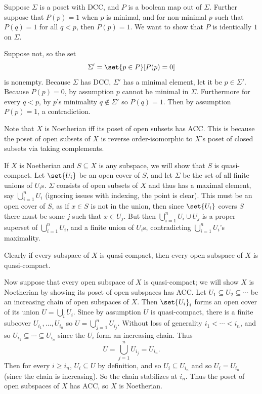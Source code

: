 \eprob

\benum
    \item Suppose $\Sigma$ is a poset with DCC, and $P$ is a boolean map out of $\Sigma$.
    Further suppose that $P(p)=1$ when $p$ is minimal, and for non-minimal $p$ such that $P(q)=1$ for all $q<p$, then
    $P(p)=1$.
    We want to show that $P$ is identically $1$ on $\Sigma$.

    Suppose not, so the set
    $$ \Sigma' = \set{p\in P}[P(p)=0] $$
    is nonempty.
    Because $\Sigma$ has DCC, $\Sigma'$ has a minimal element, let it be $p\in\Sigma'$.
    Because $P(p)=0$, by assumption $p$ cannot be minimal in $\Sigma$.
    Furthermore for every $q<p$, by $p$'s minimality $q\notin\Sigma'$ so $P(q)=1$.
    Then by assumption $P(p)=1$, a contradiction.

    \item Note that $X$ is Noetherian iff its poset of open subsets has ACC.
    This is because the poset of open subsets of $X$ is reverse order-isomorphic to $X$'s poset of closed subsets
    via taking complements.

    If $X$ is Noetherian and $S\subseteq X$ is any subspace, we will show that $S$ is quasi-compact.
    Let $\set{U_i}$ be an open cover of $S$, and let $\Sigma$ be the set of all finite unions of $U_i$s.
    $\Sigma$ consists of open subsets of $X$ and thus has a maximal element, say $\bigcup_{i=1}^nU_i$ (ignoring issues
    with indexing, the point is clear).
    This must be an open cover of $S$, as if $x\in S$ is not in the union, then since $\set{U_i}$ covers $S$ there must
    be some $j$ such that $x\in U_j$.
    But then $\bigcup_{i=1}^nU_i\cup U_j$ is a proper superset of $\bigcup_{i=1}^nU_i$, and a finite union of $U_i$s,
    contradicting $\bigcup_{i=1}^nU_i$'s maximality.

    Clearly if every subspace of $X$ is quasi-compact, then every open subspace of $X$ is quasi-compact.

    Now suppose that every open subspace of $X$ is quasi-compact; we will show $X$ is Noetherian by showing its poset
    of open subspaces has ACC.
    Let $U_1\subseteq U_2\subseteq\cdots$ be an increasing chain of open subspaces of $X$.
    Then $\set{U_i}_i$ forms an open cover of its union $U=\bigcup_iU_i$.
    Since by assumption $U$ is quasi-compact, there is a finite subcover $U_{i_1},\dots,U_{i_n}$ so $U=\bigcup_{j=1}^nU_{i_j}$.
    Without loss of generality $i_1<\cdots<i_n$, and so $U_{i_1}\subseteq\cdots\subseteq U_{i_n}$ since the $U_i$
    form an increasing chain.
    Thus
    $$ U = \bigcup_{j=1}^nU_{i_j} = U_{i_n} . $$
    Then for every $i\geq i_n$, $U_i\subseteq U$ by definition, and so $U_i\subseteq U_{i_n}$ and so $U_i=U_{i_n}$
    (since the chain is increasing).
    So the chain stabilizes at $i_n$.
    Thus the poset of open subspaces of $X$ has ACC, so $X$ is Noetherian.

